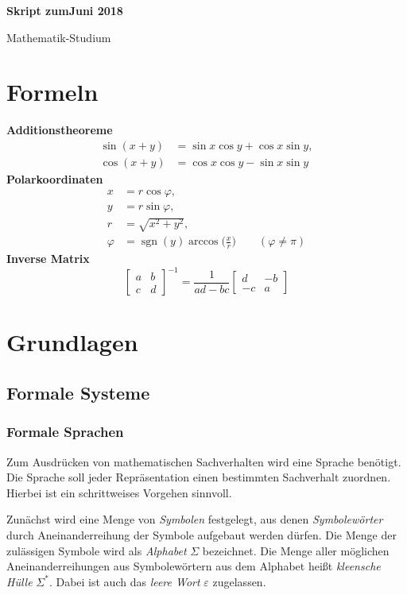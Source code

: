 \documentclass[a4paper,11pt,fleqn,twoside]{scrartcl}
\numberwithin{equation}{section}
\newcommand{\strong}[1]{{\normalfont\sffamily\bfseries #1}}
\newcommand{\emdef}[1]{\emph{#1}}
\begin{document}
\thispagestyle{empty}

\noindent
{\huge\sffamily\bfseries
Skript zum\hfill {\normalsize\rmfamily\mdseries Juni 2018}
\par\noindent
Mathematik-Studium
\par}

\tableofcontents

\newpage
\section*{Formeln}
\strong{Additionstheoreme}
\begin{align*}
\sin(x+y) &= \sin x\cos y + \cos x\sin y,\\
\cos(x+y) &= \cos x\cos y - \sin x\sin y
\end{align*}
\strong{Polarkoordinaten}
\begin{align*}
x &= r\cos\varphi,\\
y &= r\sin\varphi,\\
r &= \sqrt{x^2+y^2},\\
\varphi &= \operatorname{sgn}(y)\arccos\Big(\frac{x}{r}\Big)\qquad (\varphi\ne\pi)
\end{align*}
\strong{Inverse Matrix}
\[
\begin{bmatrix}
a & b\\
c & d
\end{bmatrix}^{-1}
= \frac{1}{ad-bc} \begin{bmatrix}
d & -b\\
-c & a
\end{bmatrix}
\]

\newpage

\section{Grundlagen}
\subsection{Formale Systeme}
\subsubsection{Formale Sprachen}
Zum Ausdrücken von mathematischen Sachverhalten wird eine Sprache
benötigt. Die Sprache soll jeder Repräsentation einen bestimmten
Sachverhalt zuordnen. Hierbei ist ein schrittweises Vorgehen
sinnvoll.

Zunächst wird eine Menge von \emdef{Symbolen} festgelegt, aus denen
\emdef{Symbolewörter} durch Aneinanderreihung der Symbole aufgebaut
werden dürfen. Die Menge der zulässigen Symbole wird als
\emdef{Alphabet} $\Sigma$ bezeichnet. Die Menge aller möglichen
Aneinanderreihungen aus Symbolewörtern aus dem Alphabet heißt
\emdef{kleensche Hülle} $\Sigma^*$. Dabei ist auch das
\emdef{leere Wort} $\varepsilon$ zugelassen.
\end{document}
